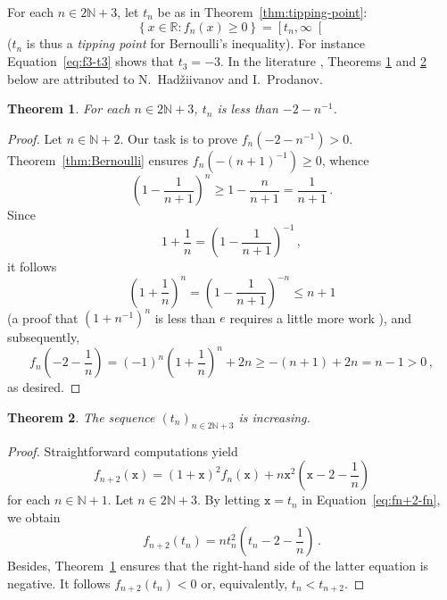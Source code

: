 \documentclass[12pt]{article}
\newcommand{\bR}{\mathbb{R}}
\newcommand{\bN}{\mathbb{N}}
\newcommand{\geint}[1]{\left[ #1, \infty \right[}
\newcommand{\ltint}[1]{\left]- \infty, #1 \right[}
\newcommand{\ttx}{\mathtt{x}}
\newtheorem{theorem}{Theorem}
\begin{document}
 For each $n \in 2 \bN + 3$,
 let $t_n$ be as in Theorem~\ref{thm:tipping-point}:
 $$
 \left\{ x \in \bR : f_n(x) \ge 0 \right\}
 = \geint{t_n} 
 $$
 ($t_n$ is thus a \emph{tipping point} for Bernoulli's inequality).
 For instance Equation~\eqref{eq:f3-t3} shows that $t_3 = - 3$. 
 In the literature \cite{MitrinovicCNIA, MitrinovicAI, MitrinovicP93, MondP94},
 Theorems \ref{thm:HP-upper} and \ref{thm:HP-tn-increase} below are attributed to N.~Had\v{z}iivanov and I.~Prodanov.
 
 \begin{theorem} \label{thm:HP-upper}
   For each $n \in 2 \bN + 3$, $t_n$ is less than $- 2 - n^{-1}$.
 \end{theorem}

 \begin{proof}
Let $n \in \bN + 2$.
   Our task is to prove $f_n(- 2 - n^{-1}) > 0$.
   Theorem~\ref{thm:Bernoulli} ensures $f_n(- {(n + 1)}^{-1}) \ge 0$, whence
   $$
   \left( 1 - \frac{1}{n + 1} \right)^n \ge 1 - \frac{n}{n + 1} = \frac{1}{n + 1} \,.
   $$
   Since 
   $$
   1 + \frac{1}{n} = \left( 1 - \frac{1}{n + 1} \right)^{-1} \,,
   $$
   it follows 
   $$
  \left( 1 + \frac{1}{n} \right)^n = \left( 1 - \frac{1}{n + 1} \right)^{-n}  \le n + 1 
  $$
  (a proof that ${(1 + n^{-1} )}^n$ is less than $e$ requires a little more work \cite{Wiener85}),
  and subsequently,
  $$
  f_n \left(- 2 - \frac{1}{n} \right) = {(- 1)}^n \left( 1 + \frac{1}{n} \right)^n + 2 n \ge - (n + 1) + 2 n = n - 1 > 0 \,,
  $$
  as desired.
 \end{proof} 
 
 
\begin{theorem} \label{thm:HP-tn-increase} 
  The sequence $\left( t_n \right)_{n \in 2 \bN + 3}$ is increasing.
 \end{theorem} 

 \begin{proof}
   Straightforward computations yield
   \begin{equation} \label{eq:fn+2-fn}
   f_{n + 2} (\ttx) = {(1 + \ttx)}^2 f_n(\ttx) + n \ttx^2 \left(\ttx - 2 - \frac{1}{n} \right) 
 \end{equation}
 for each $n \in \bN + 1$.
 Let $n \in 2 \bN + 3$.
 By letting $\ttx = t_n$ in Equation~\eqref{eq:fn+2-fn}, we obtain
$$ 
f_{n + 2} (t_n) = n t_n^2 \left(t_n - 2 - \frac{1}{n} \right) \, .
$$
Besides, Theorem~\ref{thm:HP-upper} ensures that the right-hand side of the latter equation is negative.
It follows $f_{n + 2} (t_n) < 0$ or, equivalently, $t_n < t_{n + 2}$.
 \end{proof}
\end{document}
